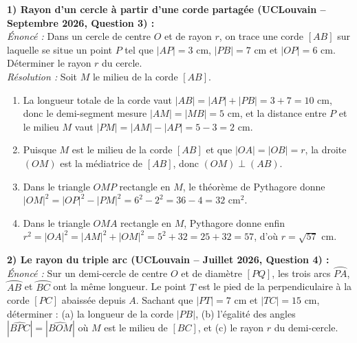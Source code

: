 \begin{exemple}
\textbf{1) Rayon d'un cercle à partir d'une corde partagée (UCLouvain -- Septembre 2026, Question 3) :}\\
\emph{Énoncé :} Dans un cercle de centre $O$ et de rayon $r$, on trace une corde $[AB]$ sur laquelle se situe un point $P$ tel que $|AP| = 3\text{ cm}$, $|PB| = 7\text{ cm}$ et $|OP| = 6\text{ cm}$. Déterminer le rayon $r$ du cercle.\\
\emph{Résolution :} Soit $M$ le milieu de la corde $[AB]$.
\begin{enumerate}
    \item La longueur totale de la corde vaut $|AB| = |AP| + |PB| = 3 + 7 = 10\text{ cm}$, donc le demi-segment mesure $|AM| = |MB| = 5\text{ cm}$, et la distance entre $P$ et le milieu $M$ vaut $|PM| = |AM| - |AP| = 5 - 3 = 2\text{ cm}$.
    \item Puisque $M$ est le milieu de la corde $[AB]$ et que $|OA| = |OB| = r$, la droite $(OM)$ est la médiatrice de $[AB]$, donc $(OM) \perp (AB)$.
    \item Dans le triangle $OMP$ rectangle en $M$, le théorème de Pythagore donne $|OM|^2 = |OP|^2 - |PM|^2 = 6^2 - 2^2 = 36 - 4 = 32\text{ cm}^2$.
    \item Dans le triangle $OMA$ rectangle en $M$, Pythagore donne enfin $r^2 = |OA|^2 = |AM|^2 + |OM|^2 = 5^2 + 32 = 25 + 32 = 57$, d'où $r = \boxed{\sqrt{57}\text{ cm}}$.
\end{enumerate}

\medskip
\textbf{2) Le rayon du triple arc (UCLouvain -- Juillet 2026, Question 4) :}\\
\emph{Énoncé :} Sur un demi-cercle de centre $O$ et de diamètre $[PQ]$, les trois arcs $\wideparen{PA}$, $\wideparen{AB}$ et $\wideparen{BC}$ ont la même longueur. Le point $T$ est le pied de la perpendiculaire à la corde $[PC]$ abaissée depuis $A$. Sachant que $|PT| = 7\text{ cm}$ et $|TC| = 15\text{ cm}$, déterminer : (a) la longueur de la corde $|PB|$, (b) l'égalité des angles $|\widehat{BPC}| = |\widehat{BOM}|$ où $M$ est le milieu de $[BC]$, et (c) le rayon $r$ du demi-cercle.
\begin{center}
\end{center}
\end{exemple}
